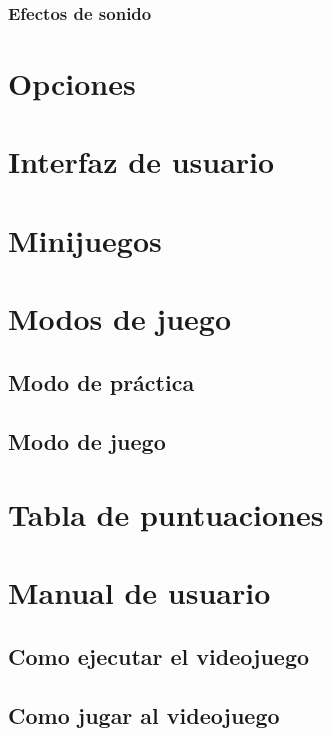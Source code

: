 \documentclass[12pt, spanish]{article}
\begin{document}
\subsubsection{Efectos de sonido}



\section{Opciones}






\section{Interfaz de usuario}



\section{Minijuegos}

\section{Modos de juego}

\subsection{Modo de práctica}

\subsection{Modo de juego}

\section{Tabla de puntuaciones}



\section{Manual de usuario}

\subsection{Como ejecutar el videojuego}


\subsection{Como jugar al videojuego}
\end{document}
